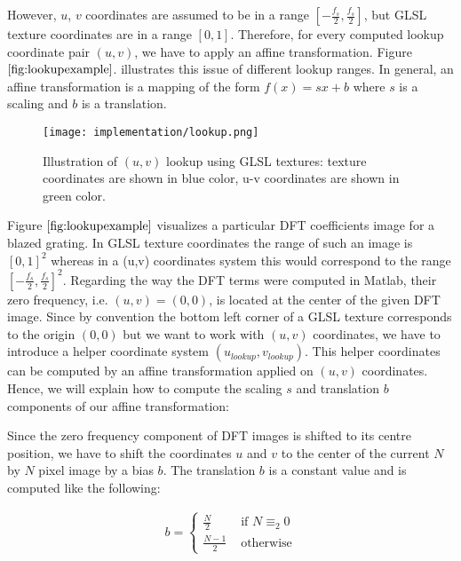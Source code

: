 However, $u$, $v$ coordinates are assumed to be in a range $[-\frac{f_s}{2}, \frac{f_s}{2}]$, but GLSL texture coordinates are in a range $[0,1]$. Therefore, for every computed lookup coordinate pair $(u,v)$, we have to apply an affine transformation. Figure $\ref{fig:lookupexample}$.  illustrates this issue of different lookup ranges. In general, an affine transformation is a mapping of the form $f(x) = sx + b$ where $s$ is a scaling and $b$ is a translation.

\begin{figure}[H]
  \centering
  \texttt{[image: implementation/lookup.png]}
  \caption[Lookup DFT Coefficients in Textures]{Illustration of $(u,v)$ lookup using GLSL textures: texture coordinates are shown in blue color, u-v coordinates are shown in green color.}
\label{fig:lookupexample}
\end{figure}

Figure $\ref{fig:lookupexample}$ visualizes a particular DFT coefficients image for a blazed grating. In GLSL texture coordinates the range of such an image is $[0,1]^2$ whereas in a (u,v) coordinates system this would correspond to the range $[-\frac{f_s}{2}, \frac{f_s}{2}]^2$. Regarding the way the DFT terms were computed in Matlab, their zero frequency, i.e. $(u,v) = (0,0)$, is located at the center of the given DFT image. Since by convention the bottom left corner of a GLSL texture corresponds to the origin $(0,0)$ but we want to work with $(u,v)$ coordinates, we have to introduce a helper coordinate system $(u_{lookup}, v_{lookup})$. This helper coordinates can be computed by an affine transformation applied on $(u,v)$ coordinates. Hence, we will explain how to compute the scaling $s$ and translation $b$ components of our affine transformation: 

Since the zero frequency component of DFT images is shifted to its centre position, we have to shift the coordinates $u$ and $v$ to the center of the current $N$ by $N$ pixel image by a bias $b$. The translation $b$ is a constant value and is computed like the following:

\begin{align}
b = \left\{ \begin{array}{rl}
\frac{N}{2} &\mbox{ if $N \equiv_2 0$} \\
\frac{N-1}{2} &\mbox{ otherwise}
\end{array} \right.
\label{eq:bias}
\end{align}


